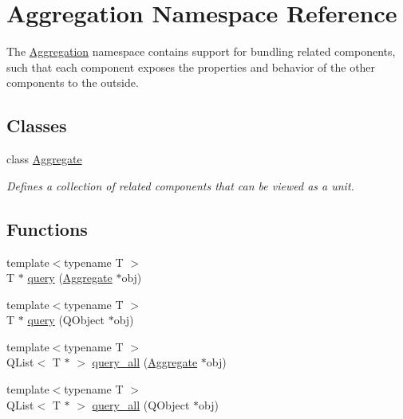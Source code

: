 \hypertarget{namespace_aggregation}{\section{\-Aggregation \-Namespace \-Reference}
\label{namespace_aggregation}
}


\-The \hyperlink{namespace_aggregation}{\-Aggregation} namespace contains support for bundling related components, such that each component exposes the properties and behavior of the other components to the outside.  


\subsection*{\-Classes}
\begin{DoxyCompactItemize}
\item 
class \hyperlink{class_aggregation_1_1_aggregate}{\-Aggregate}
\begin{DoxyCompactList}\small\item\em \-Defines a collection of related components that can be viewed as a unit. \end{DoxyCompactList}\end{DoxyCompactItemize}
\subsection*{\-Functions}
\begin{DoxyCompactItemize}
\item 
{\footnotesize template$<$typename T $>$ }\\\-T $\ast$ \hyperlink{namespace_aggregation_a1b5f85f4af221459c037427c41e18d98}{query} (\hyperlink{class_aggregation_1_1_aggregate}{\-Aggregate} $\ast$obj)
\item 
{\footnotesize template$<$typename T $>$ }\\\-T $\ast$ \hyperlink{namespace_aggregation_ad92024df426e336ab0a3e52683eaf346}{query} (\-Q\-Object $\ast$obj)
\item 
{\footnotesize template$<$typename T $>$ }\\\-Q\-List$<$ \-T $\ast$ $>$ \hyperlink{namespace_aggregation_ab01c7849f973464ac7e9c001161e4965}{query\-\_\-all} (\hyperlink{class_aggregation_1_1_aggregate}{\-Aggregate} $\ast$obj)
\item 
{\footnotesize template$<$typename T $>$ }\\\-Q\-List$<$ \-T $\ast$ $>$ \hyperlink{namespace_aggregation_a85966ec6218e2acb334634407d87f563}{query\-\_\-all} (\-Q\-Object $\ast$obj)
\end{DoxyCompactItemize}


